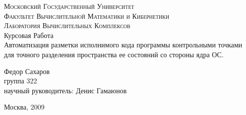 \begin{titlepage}
	\begin{center}
	\textsc{\large{Московский Государственный Университет}
	\\[.5cm]
	\normalsize{Факультет Вычислительной Математики и Кибернетики\\
	Лаборатория Вычислительных Комплексов}}
	\\[4cm]

	\large{Курсовая Работа }\\[1.5cm]

	{\Large {Автоматизация разметки исполнимого кода программы 
	контрольными точками для точного разделения пространства 
	ее состояний со стороны ядра ОС.}} \\[3cm]
	\begin{flushright}
		Федор Сахаров\\
		группа 322\\
		научный руководитель: Денис Гамаюнов
	\end{flushright}
	\vfill
	
	Москва, 2009
	\end{center}

\end{titlepage}

